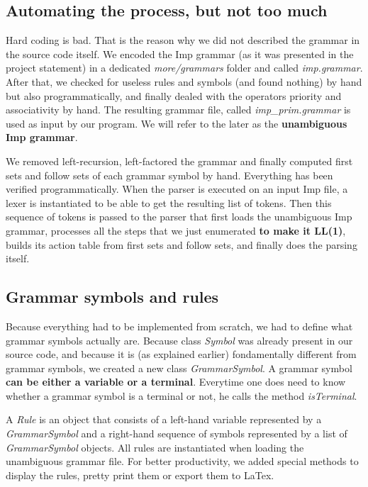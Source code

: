 
\subsection{Automating the process, but not too much}

Hard coding is bad. That is the reason why we did not described the grammar in the source code itself.
We encoded the Imp grammar (as it was presented in the project statement) in a dedicated \textit{more/grammars} folder and called \textit{imp.grammar}.
After that, we checked for useless rules and symbols (and found nothing) by hand but also programmatically, and finally dealed with
the operators priority and associativity by hand. The resulting grammar file, called \textit{imp\_prim.grammar} is used as input by our program.
We will refer to the later as the \textbf{unambiguous Imp grammar}.

We removed left-recursion, left-factored the grammar and finally computed first sets and follow sets of each grammar symbol by hand. 
Everything has been verified programmatically. When the parser is executed on an input Imp file, a lexer is instantiated to be able
to get the resulting list of tokens. Then this sequence of tokens is passed to the parser that first loads the unambiguous Imp grammar,
processes all the steps that we just enumerated \textbf{to make it LL(1)}, 
builds its action table from first sets and follow sets, and finally does the parsing itself.

\subsection{Grammar symbols and rules}

Because everything had to be implemented from scratch, we had to define what grammar symbols actually are. Because class \textit{Symbol}
was already present in our source code, and because it is (as explained earlier) fondamentally different from grammar symbols,
we created a new class \textit{GrammarSymbol}. A grammar symbol \textbf{can be either a variable or a terminal}. Everytime one does need
to know whether a grammar symbol is a terminal or not, he calls the method \textit{isTerminal}.

A \textit{Rule} is an object that consists of a left-hand variable represented by a \textit{GrammarSymbol} and a right-hand sequence
of symbols represented by a list of \textit{GrammarSymbol} objects. All rules are instantiated when loading the unambiguous grammar file.
For better productivity, we added special methods to display the rules, pretty print them or export them to LaTex.

